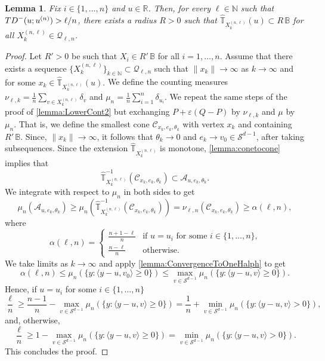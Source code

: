 \documentclass[11pt]{article}
\newcommand{\R}{\mathbb{R}}
\newcommand{\N}{\mathbb{N}}
\newcommand{\eps}{\varepsilon}
\theoremstyle{plain}
\newtheorem{lemma}[sectioncount]{Lemma}
\theoremstyle{definition}
\begin{document}
\begin{lemma}
    \label{lemma:LowerDisc}
    Fix $i\in \{ 1, \dots, n\}$ and $u\in \R$.  Then, for every $\ell\in \N$ such that   ${\rm TD}^-( {u};u^{(n)})>\ell/n$, there exists a radius $R>0$ such that $\hat{ {\mathbb{T}}}_{X^{(n,\ell)}_{k}}(u)\subset  R\,\mathbb{B}$ for all $X^{(n,\ell)}_{k}\in \mathcal{Q}_{\ell,n}$.
\end{lemma}
\begin{proof} 
 Let $R'>0$ be such that $X_i\in R'\, \mathbb{B}$ for all $i=1, \dots, n$. 
 {Assume  that there exists a sequence $\{X^{(n,\ell)}_{k}\}_{k\in \N}\subset  \mathcal{Q}_{\ell,n}$ such that $\|x_k\|\to \infty$  as $k\to \infty$ and for some $x_k\in \hat{ {\mathbb{T}}}_{X^{(n,\ell)}_{k}}(u) $.}  We define the counting measures $\nu_{\ell, k}=\frac{1}{n}\sum_{ {v}\in X^{(n,\ell)}_{k}}\delta_{ {v}}$ and $\mu_{n}=\frac{1}{n}\sum_{i=1}^n \delta_{u_i}$. We repeat the same steps of the proof of \autoref{lemma:LowerCont2} but exchanging $P+\eps (Q-P) $ by $\nu_{\ell, k}$ and $\mu$ by $\mu_n$.  {That is, we define the smallest cone $\mathcal{C}_{x_k,e_k,\theta_k}$ with vertex $x_k$ and containing $R'\, \mathbb{B}$. Since,  $\|x_k\|\to \infty$, it follows that $\theta_k\to 0$ and  $e_k\to v_0\in \mathcal{S}^{d-1}$, after taking subsequences. Since the extension $\hat{{\mathbb{T}}}_{X^{(n,\ell)}_{k}}$ is monotone, \autoref{lemma:conetocone} implies that 
$$ \hat{{\mathbb{T}}}_{X^{(n,\ell)}_{k}}^{-1}(\mathcal{C}_{x_k,e_k,\theta_k}) \subset \mathcal{A}_{u,e_k,\theta_k}. $$
We integrate with respect to $\mu_n$ in both sides to get
$$ \mu_n(\mathcal{A}_{u,e_k,\theta_k}) \geq \mu_n(\hat{{\mathbb{T}}}_{X^{(n,\ell)}_{k}}^{-1}(\mathcal{C}_{x_k,e_k,\theta_k}) ) =  \nu_{\ell,n}(\mathcal{C}_{x_k,e_k,\theta_k}) \geq \alpha(\ell,n) , $$
where 
$$ \alpha(\ell,n)=\begin{cases}
    \frac{n+1-\ell}{n} & \text{if $u=u_i$ for some $i\in \{1, \dots, n\}$,}\\
    \frac{n-\ell}{n} & \text{otherwise}.
\end{cases} $$
We take limits as $k\to \infty$ and apply \autoref{lemma:ConvergenceToOneHalph} to get
$$  \alpha(\ell,n) \leq \mu_n (\{ y: 
      \langle  y-{u}, v_0\rangle\geq 
0  \} ) \leq \max_{v\in \mathcal{S}^{d-1}}\mu_n (\{ y: 
      \langle  y-{u}, v\rangle\geq 
0  \} )  .$$
Hence, if $u=u_i$ for some $i\in \{1, \dots, n\}$
$$  \frac{\ell}{n} \geq \frac{n-1}{n}- \max_{v\in \mathcal{S}^{d-1}}\mu_n (\{ y: 
      \langle  y-{u}, v\rangle\geq 
0  \} ) =\frac{1}{n}+\min_{v\in \mathcal{S}^{d-1}}\mu_n (\{ y: 
      \langle  y-{u}, v\rangle> 
0  \} ) ,$$
and, otherwise, 
$$  \frac{\ell}{n} \geq 1- \max_{v\in \mathcal{S}^{d-1}}\mu_n (\{ y: 
      \langle  y-{u}, v\rangle\geq 
0  \} ) =\min_{v\in \mathcal{S}^{d-1}}\mu_n (\{ y: 
      \langle  y-{u}, v\rangle> 
0  \} ) .$$
This concludes the proof.} 
\end{proof}
%
\end{document}
